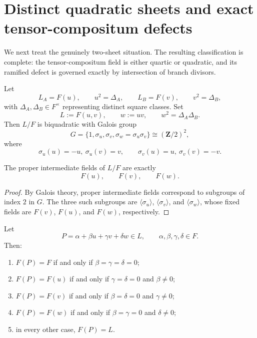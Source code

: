 \section{Distinct quadratic sheets and exact tensor-compositum defects}
\label{sec:distinct-quadratic-sheets}

We next treat the genuinely two-sheet situation.  The resulting classification
is complete: the tensor-compositum field is either quartic or quadratic, and
its ramified defect is governed exactly by intersection of branch divisors.

\begin{setup}
\label{setup:distinct-quadratic-sheets}
Let
\[
L_A=F(u),\qquad u^2=\Delta_A,
\qquad
L_B=F(v),\qquad v^2=\Delta_B,
\]
with $\Delta_A,\Delta_B\in F^{\times}$ representing distinct square classes.
Set
\[
L:=F(u,v),\qquad w:=uv,
\qquad w^2=\Delta_A\Delta_B.
\]
Then $L/F$ is biquadratic with Galois group
\[
G=\{1,\sigma_u,\sigma_v,\sigma_w=\sigma_u\sigma_v\}\cong (\mathbf Z/2)^2,
\]
where
\[
\sigma_u(u)=-u,\ \sigma_u(v)=v,
\qquad
\sigma_v(u)=u,\ \sigma_v(v)=-v.
\]
\end{setup}

\begin{lemma}
\label{lem:biquadratic-intermediates}
The proper intermediate fields of $L/F$ are exactly
\[
F(u),\qquad F(v),\qquad F(w).
\]
\end{lemma}

\begin{proof}
By Galois theory, proper intermediate fields correspond to subgroups of index
$2$ in $G$.  The three such subgroups are
$\langle\sigma_u\rangle$, $\langle\sigma_v\rangle$, and
$\langle\sigma_w\rangle$, whose fixed fields are $F(v)$, $F(u)$, and $F(w)$,
respectively.
\end{proof}

\begin{theorem}
\label{thm:biquadratic-generated-field-classification}
Let
\[
P=\alpha+\beta u+\gamma v+\delta w\in L,
\qquad \alpha,\beta,\gamma,\delta\in F.
\]
Then:
\begin{enumerate}[label=\textup{(\roman*)}]
\item $F(P)=F$ if and only if $\beta=\gamma=\delta=0$;
\item $F(P)=F(u)$ if and only if $\gamma=\delta=0$ and $\beta\neq 0$;
\item $F(P)=F(v)$ if and only if $\beta=\delta=0$ and $\gamma\neq 0$;
\item $F(P)=F(w)$ if and only if $\beta=\gamma=0$ and $\delta\neq 0$;
\item in every other case, $F(P)=L$.
\end{enumerate}
\end{theorem}

